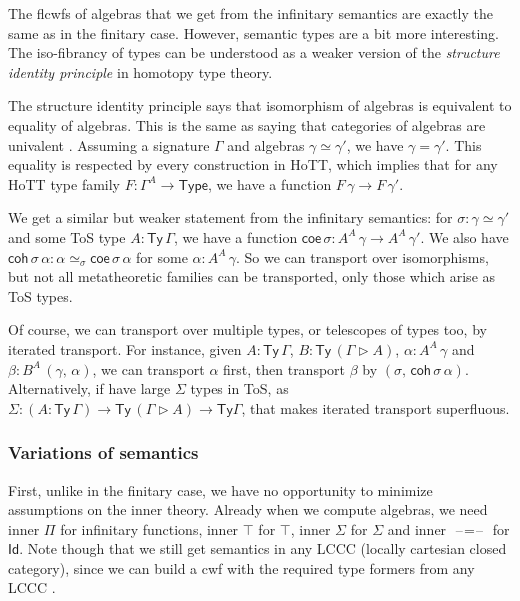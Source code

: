 \documentclass[12pt,a4paper,twoside,openany]{book}
\theoremstyle{remark}
\theoremstyle{definition}
\theoremstyle{theorem}
\newcommand{\ms}[1]{\mathsf{#1}}
\newcommand{\Ty}{\mathsf{Ty}}
\newcommand{\Id}{\mathsf{Id}}
\newcommand{\blank}{\mathord{\hspace{1pt}\text{--}\hspace{1pt}}}
\newcommand{\ext}{\triangleright}
\newcommand{\coe}{\mathsf{coe}}
\newcommand{\coh}{\mathsf{coh}}
\begin{document}
The flcwfs of algebras that we get from the infinitary semantics are exactly the
same as in the finitary case. However, semantic types are a bit more
interesting. The iso-fibrancy of types can be understood as a weaker version of
the \emph{structure identity principle} in homotopy type theory.

The structure identity principle says that isomorphism of algebras is equivalent
to equality of algebras. This is the same as saying that categories of algebras
are univalent \cite{univalent-categories}. Assuming a signature $\Gamma$ and
algebras $\gamma \simeq \gamma'$, we have $\gamma = \gamma'$. This equality is
respected by every construction in HoTT, which implies that for any HoTT type
family $F : \Gamma^A \to \ms{Type}$, we have a function $F\,\gamma \to
F\,\gamma'$.

We get a similar but weaker statement from the infinitary semantics: for $\sigma
: \gamma \simeq \gamma'$ and some ToS type $A : \Ty\,\Gamma$, we have a function
$\coe\,\sigma : A^A\,\gamma \to A^A\,\gamma'$. We also have
$\coh\,\sigma\,\alpha : \alpha \simeq_{\sigma} \coe\,\sigma\,\alpha$ for some
$\alpha : A^A\,\gamma$. So we can transport over isomorphisms, but not all
metatheoretic families can be transported, only those which arise as ToS types.

Of course, we can transport over multiple types, or telescopes of types too, by
iterated transport. For instance, given $A : \Ty\,\Gamma$, $B : \Ty\,(\Gamma
\ext A)$, $\alpha : A^A\,\gamma$ and $\beta : B^A\,(\gamma,\,\alpha)$, we can
transport $\alpha$ first, then transport $\beta$ by
$(\sigma,\,\coh\,\sigma\,\alpha)$.  Alternatively, if have large $\Sigma$ types
in ToS, as $\Sigma : (A : \Ty\,\Gamma) \to \Ty\,(\Gamma \ext A) \to \Ty \Gamma$,
that makes iterated transport superfluous.

\subsubsection{Variations of semantics}

First, unlike in the finitary case, we have no opportunity to minimize
assumptions on the inner theory. Already when we compute algebras, we need inner
$\Pi$ for infinitary functions, inner $\top$ for $\top$, inner $\Sigma$ for
$\Sigma$ and inner $\blank\!=\!\blank$ for $\Id$. Note though that we still get
semantics in any LCCC (locally cartesian closed category), since we can build a
cwf with the required type formers from any LCCC
\cite{clairambault2014biequivalence}.
\end{document}
